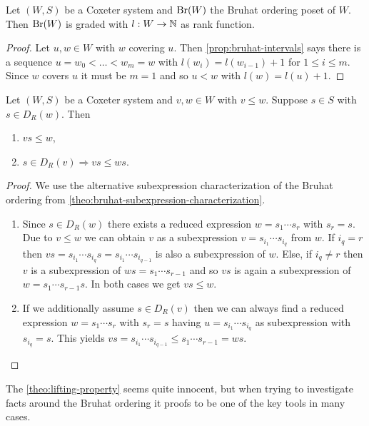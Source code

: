 \begin{coro}
	Let $(W,S)$ be a Coxeter system and $\operatorname{Br}(W)$ the Bruhat ordering poset of $W$. Then $\operatorname{Br}(W)$ is graded with $l:W \to \mathbb{N}$ as rank function.

	\begin{proof}
		Let $u,w \in W$ with $w$ covering $u$. Then \ref{prop:bruhat-intervals} says there is a sequence $u = w_0 < \ldots < w_m = w$ with $l(w_i) = l(w_{i-1}) + 1$ for $1 \leq i \leq m$. Since $w$ covers $u$ it must be $m = 1$ and so $u < w$ with $l(w) = l(u) + 1$.
	\end{proof}
\end{coro}

\begin{theo}[Lifting Property]
	Let $(W,S)$ be a Coxeter system and $v,w \in W$ with $v \leq w$. Suppose $s \in S$ with $s \in D_R(w)$. Then
	\begin{enumerate}
		\item $vs \leq w$,
		\item $s \in D_R(v) \Rightarrow vs \leq ws$.
	\end{enumerate}

	\begin{proof}
		We use the alternative subexpression characterization of the Bruhat ordering from \ref{theo:bruhat-subexpression-characterization}.
		\begin{enumerate}
			\item Since $s \in D_R(w)$ there exists a reduced expression $w = s_1 \cdots s_r$ with $s_r = s$. Due to $v \leq w$ we can obtain $v$ as a subexpression $v = s_{i_1} \cdots s_{i_q}$ from $w$. If $i_q = r$ then $vs = s_{i_1} \cdots s_{i_q} s = s_{i_1} \cdots s_{i_{q - 1}}$ is also a subexpression of $w$. Else, if $i_q \neq r$ then $v$ is a subexpression of $ws = s_1 \cdots s_{r-1}$ and so $vs$ is again a subexpression of $w = s_1 \cdots s_{r-1} s$. In both cases we get $vs \leq w$.
			\item If we additionally assume $s \in D_R(v)$ then we can always find a reduced expression $w = s_1 \cdots s_r$ with $s_r = s$ having $u = s_{i_1} \cdots s_{i_q}$ as subexpression with $s_{i_q} = s$. This yields $vs = s_{i_1} \cdots s_{i_{q-1}} \leq s_1 \cdots s_{r-1} = ws$. \qedhere
		\end{enumerate}
	\end{proof}
\end{theo}

The \ref{theo:lifting-property} seems quite innocent, but when trying to investigate facts around the Bruhat ordering it proofs to be one of the key tools in many cases.